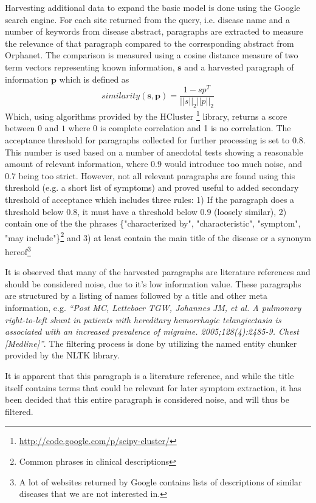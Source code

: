 \documentclass[10pt,letterpaper,final]{article}
\begin{document}
Harvesting additional data to expand the basic model is done using the
Google search engine. For each site returned from the query, i.e.
disease name and a number of keywords from disease abstract, paragraphs
are extracted to measure the relevance of that paragraph compared to the
corresponding abstract from Orphanet. The comparison is measured using a
cosine distance measure of two term vectors representing known
information, $\textbf{s}$ and a harvested paragraph of information
$\textbf{p}$ which is defined as
\[
similarity(\textbf{s}, \textbf{p}) = \frac{1 - sp^T}{||s||_2 ||p||_2}
\]
Which, using algorithms provided by the HCluster
\footnote{\url{http://code.google.com/p/scipy-cluster/}} library, returns
a score between $0$ and $1$ where 0 is complete correlation and 1 is
no correlation. The acceptance threshold for paragraphs collected for
further processing is set to $0.8$. This number is used based on a
number of anecdotal tests showing a reasonable amount of relevant
information, where $0.9$ would introduce too much noise, and $0.7$ being
too strict. However, not all relevant paragraphs are found using this threshold
(e.g. a short list of symptoms) and proved useful to added secondary threshold of
acceptance which includes three rules: 1) If the paragraph does a threshold below
$0.8$, it must have a threshold below $0.9$ (loosely similar), 2) contain one of the
the phrases \{"characterized by", "characteristic", "symptom", "may include"\}\footnote{Common phrases in clinical descriptions} and 3) at least contain the main title of the disease or a synonym hereof\footnote{A lot of websites returned by Google contains lists of descriptions of similar diseases that we are not interested in.}

It is observed that many of the harvested paragraphs are literature
references and should be considered noise, due to it's low information
value.
These paragraphs are structured by a listing of names followed by a
title and other meta information, e.g.
\textit{``Post MC, Letteboer TGW, Johannes JM, et al. A pulmonary
right-to-left shunt in patients with hereditary hemorrhagic
telangiectasia is associated with an increased prevalence of migraine.
2005;128(4):2485-9. Chest [Medline]''}. The filtering process is done by
utilizing the named entity chunker provided by the NLTK library.

It is apparent that this paragraph is a literature reference, and while
the title itself contains terms that could be relevant for later symptom
extraction, it has been decided that this entire paragraph is considered
noise, and will thus be filtered.
\end{document}
